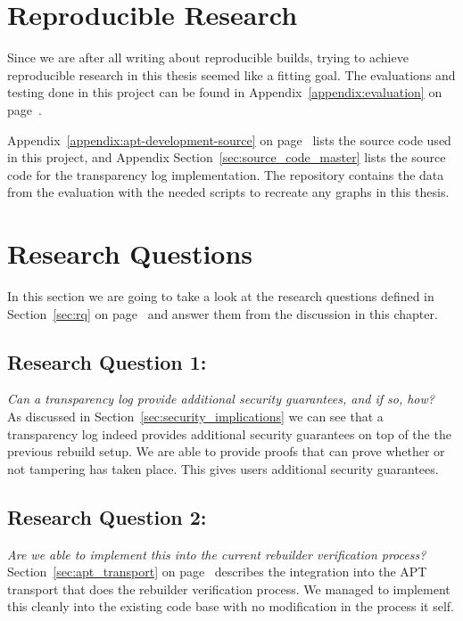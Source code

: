 \documentclass[../Main/thesis.tex]{subfiles}
\begin{document}
\section{Reproducible Research}%
\label{sec:reproducible_research}
Since we are after all writing about reproducible builds, trying to achieve
reproducible research in this thesis seemed like a fitting goal. The evaluations
and testing done in this project can be found in
Appendix~\ref{appendix:evaluation} on page~\pageref{appendix:evaluation}.

Appendix~\ref{appendix:apt-development-source} on
page~\pageref{appendix:apt-development-source} lists the source code used in
this project, and Appendix Section~\ref{sec:source_code_master} lists the source
code for the transparency log implementation. The repository contains the data
from the evaluation with the needed scripts to recreate any graphs in this
thesis.

\section{Research Questions}%
\label{sec:research_questions}
In this section we are going to take a look at the research questions defined
in Section~\ref{sec:rq} on page~\pageref{sec:rq} and answer them from the
discussion in this chapter.

\subsection*{Research Question 1:}%
\label{sub:research_question_1_}
\textit{Can a transparency log provide additional security guarantees, and
if so, how?}\\
As discussed in Section~\ref{sec:security_implications} we can see that a
transparency log indeed provides additional security guarantees on top of the
the previous rebuild setup. We are able to provide proofs that can prove whether
or not tampering has taken place. This gives users additional security
guarantees.

\subsection*{Research Question 2:}%
\label{sub:research_question_2_}
\textit{Are we able to implement this into the current rebuilder verification
process?}\\
Section~\ref{sec:apt_transport} on page~\pageref{sec:apt_transport} describes
the integration into the APT transport that does the rebuilder verification
process. We managed to implement this cleanly into the existing code base with
no modification in the process it self.
\end{document}
